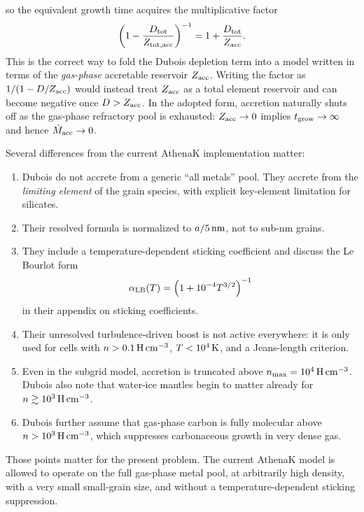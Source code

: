 \documentclass[11pt]{article}
\begin{document}
so the equivalent growth time acquires the multiplicative factor
\begin{equation}
\left(1-\frac{D_{\rm tot}}{Z_{{\rm tot},\rm acc}}\right)^{-1}
=1+\frac{D_{\rm tot}}{Z_{\rm acc}}.
\label{eq:dubois_tgrow_proxy}
\end{equation}
This is the correct way to fold the Dubois depletion term into a model written in terms of the \emph{gas-phase} accretable reservoir $Z_{\rm acc}$. Writing the factor as $1/(1-D/Z_{\rm acc})$ would instead treat $Z_{\rm acc}$ as a total element reservoir and can become negative once $D>Z_{\rm acc}$. In the adopted form, accretion naturally shuts off as the gas-phase refractory pool is exhausted: $Z_{\rm acc}\rightarrow 0$ implies $t_{\rm grow}\rightarrow \infty$ and hence $\dot{M}_{\rm acc}\rightarrow 0$.

Several differences from the current AthenaK implementation matter:
\begin{enumerate}
\item Dubois do not accrete from a generic ``all metals'' pool. They accrete from the \emph{limiting element} of the grain species, with explicit key-element limitation for silicates.
\item Their resolved formula is normalized to $a/5\,{\rm nm}$, not to sub-nm grains.
\item They include a temperature-dependent sticking coefficient and discuss the Le Bourlot form
\begin{equation}
\alpha_{\rm LB}(T)=\left(1+10^{-4}T^{3/2}\right)^{-1}
\label{eq:alpha_lb}
\end{equation}
in their appendix on sticking coefficients.
\item Their unresolved turbulence-driven boost is not active everywhere: it is only used for cells with $n>0.1\,{\rm H\,cm^{-3}}$, $T<10^4\,{\rm K}$, and a Jeans-length criterion.
\item Even in the subgrid model, accretion is truncated above $n_{\max}=10^4\,{\rm H\,cm^{-3}}$. Dubois also note that water-ice mantles begin to matter already for $n\gtrsim 10^3\,{\rm H\,cm^{-3}}$.
\item Dubois further assume that gas-phase carbon is fully molecular above $n>10^3\,{\rm H\,cm^{-3}}$, which suppresses carbonaceous growth in very dense gas.
\end{enumerate}

Those points matter for the present problem. The current AthenaK model is allowed to operate on the full gas-phase metal pool, at arbitrarily high density, with a very small small-grain size, and without a temperature-dependent sticking suppression.
\end{document}
